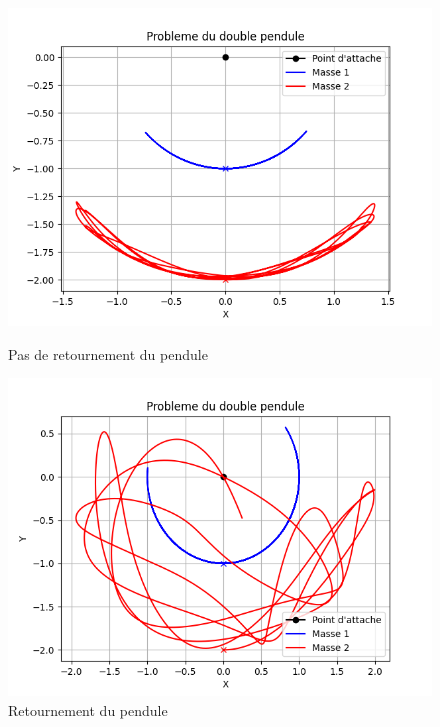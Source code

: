 \documentclass{article}
\begin{document}
\begin{figure} [htbp!]
  \begin{minipage}[c]{0.5\textwidth}
    \centering
    \includegraphics[width=\textwidth]{res/no_retournement.png}
    \caption{Pas de retournement du pendule}
      \label{fig:no_retournement}
  \end{minipage}\hfill
  \begin{minipage}[c]{0.5\textwidth}
    \centering
    \includegraphics[width=\textwidth]{res/retournement.png}
    \caption{Retournement du pendule}
      \label{fig:retournement}
  \end{minipage}
\end{figure}
\end{document}
